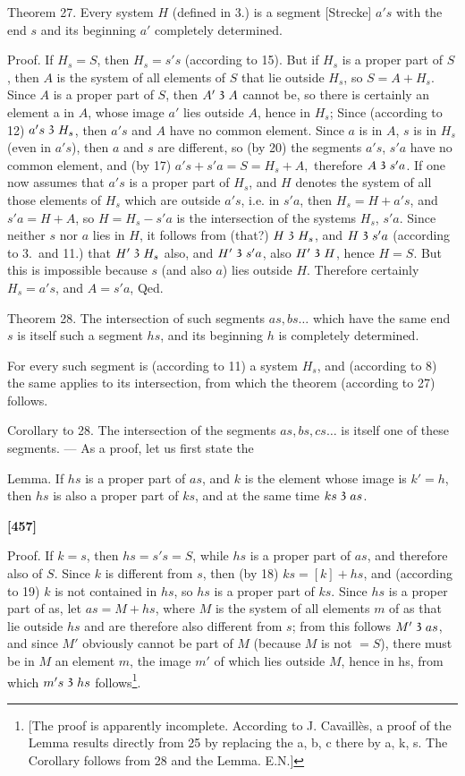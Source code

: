 \documentclass[leqno]{article}
\newcommand\partof{\mathrel{\raisebox{0.45ex}{$\mathfrak{3}$}}}
\begin{document}
Theorem 27. Every system $H$ (defined in 3.) is a segment [Strecke] $a's$ with the end $s$ and its beginning $a'$ completely determined.

Proof. If $H_s= S$, then $H_s= s's$ (according to 15). 
But if $H_s$ is a proper part of $S$, then $A$ is the system of all elements of $S$ that lie outside $H_s$, so $S=A+H_s$. 
Since $A$ is a proper part of $S$, then $A' \partof A$ cannot be, so there is certainly an element a in $A$, whose image $a'$ lies outside $A$, hence in $H_s$; 
Since (according to 12) $a's \partof H_s$, then $a's$ and $A$ have no common element. 
Since $a$ is in $A$, $s$ is in $H_s$ (even in $a's$), then $a$ and $s$ are different, so (by 20) the segments $a's$, $s'a$ have no common element, and (by 17) $a's+  s'a=S=H_s+ A,$ therefore $A \partof s'a$. 
If one now assumes that $a's$ is a proper part of $H_s$, and $H$ denotes the system of all those elements of $H_s$ which are outside $a's$, i.e. in $s'a$, then $H_s = H+a's$, and $s'a = H + A$, so $H=H_s-s'a$ is the intersection of the systems $H_s$, $s'a$. 
Since neither $s$ nor $a$ lies in $H$, it follows from (that?) $H \partof H_s$, and $H \partof s'a$ (according to 3.\ and 11.) that $H' \partof H_s$ also, and $H' \partof s'a$, also $H' \partof H$, hence $H=S$. 
But this is impossible because $s$ (and also $a$) lies outside $H$. Therefore certainly $H_s= a's$, and $A=s'a$, Qed.

Theorem 28. The intersection of such segments $as, bs\ldots$ which have the same end $s$ is itself such a segment $hs$, and its beginning $h$ is completely determined.

For every such segment is (according to 11) a system $H_s$, and (according to 8) the same applies to its intersection, from which the theorem (according to 27) follows.

Corollary to 28. The intersection of the segments $as, bs, cs \ldots$ is itself one of these segments. --- As a proof, let us first state the 

Lemma. If $hs$ is a proper part of $as$, and $k$ is the element whose image is $k'=h$, then $hs$ is also a proper part of $ks$, and at the same time $ks \partof as$.

\textbf{[457]}

Proof. If $k=s$, then $hs=s's= S$, while $hs$ is a proper part of $as$, and therefore also of $S$. Since $k$ is different from $s$, then (by 18) $ks =[k]+ hs$, and (according to 19) $k$ is not contained in $hs$, so $hs$ is a proper part of $ks$. 
Since $hs$ is a proper part of as, let $as = M + hs$, where $M$ is the system of all elements $m$ of as that lie outside $hs$ and are therefore also different from $s$; from this follows $M' \partof as$, and since $M'$ obviously cannot be part of $M$ (because $M$ is not $= S$), there must be in $M$ an element $m$, the image $m'$ of which lies outside $M$, hence in hs, from which $m's \partof hs$ follows\footnote{[The proof is apparently incomplete. According to J. Cavaillès, a proof of the Lemma results directly from 25 by replacing the a, b, c there by a, k, s. The Corollary follows from 28 and the Lemma. E.N.]}.
\end{document}
